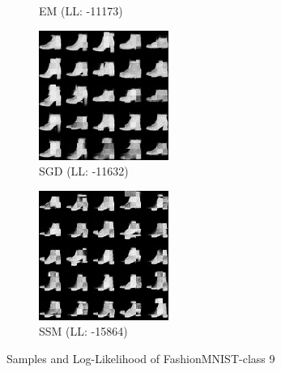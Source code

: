 \begin{figure}[H]
\begin{subfigure}[b]{0.24\textwidth}
        \caption{EM (LL: -11173)}
    \end{subfigure}
    \begin{subfigure}[b]{0.24\textwidth}
        \centering
        \includegraphics[width=\textwidth]{figures/einsum/fashion-mnist/9fashion-mnist_SGD.png} 
        \caption{SGD (LL: -11632)}
    \end{subfigure}
    \begin{subfigure}[b]{0.24\textwidth}
        \centering
        \includegraphics[width=\textwidth]{figures/einsum/fashion-mnist/9fashion-mnist_SSM.png}
        \caption{SSM (LL: -15864)}
    \end{subfigure}
    \caption{Samples and Log-Likelihood of FashionMNIST-class 9}
\end{figure}



